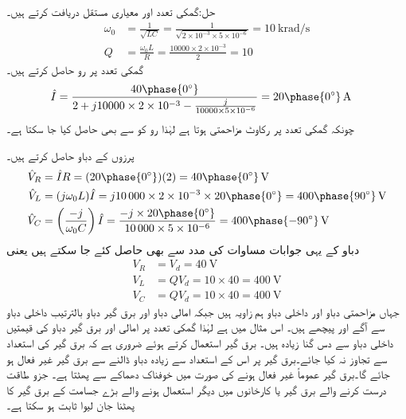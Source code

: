 حل:گمکی تعدد اور معیاری مستقل دریافت کرتے ہیں۔
\begin{align*}
\omega_0&=\frac{1}{\sqrt{LC}}=\frac{1}{\sqrt{2\times 10^{-3}\times 5\times 10^{-6}}}=\SI{10}{\kilo\radian\per\second}\\
Q&=\frac{\omega_0 L}{R}=\frac{\num{10000}\times 2\times 10^{-3}}{2}=10
\end{align*}
گمکی تعدد پر رو حاصل کرتے ہیں۔
\begin{align*}
\hat{I}&=\frac{40\phase{0^{\circ}}}{2+j10000\times 2\times 10^{-3}-\frac{j}{10000\times 5 \times 10^{-6}}}=20\phase{0^{\circ}}\,\si{\ampere}
\end{align*}
چونکہ گمکی تعدد پر رکاوٹ مزاحمتی ہوتا ہے لہٰذا رو کو  سے بھی حاصل کیا جا سکتا ہے۔

پرزوں کے دباو حاصل کرتے ہیں۔
\begin{align*}
\hat{V}_R&=\hat{I} R=(20\phase{0^{\circ}})(2)=40\phase{0^{\circ}}\,\si{\volt}\\
\hat{V}_L&=(j\omega_0 L) \hat{I}=j \num{10000}\times 2\times 10^{-3} \times 20\phase{0^{\circ}}=400\phase{90^{\circ}}\,\si{\volt}\\
\hat{V}_C&=\left(\frac{-j}{\omega_0 C}\right) \hat{I}=\frac{-j\times 20\phase{0^{\circ}}}{\num{10000}\times 5\times 10^{-6}}=400\phase{-90^{\circ}}\,\si{\volt}
\end{align*}
دباو کے یہی جوابات مساوات  کی مدد سے بھی حاصل کئے جا سکتے ہیں یعنی
\begin{align*}
V_R&=V_d=\SI{40}{\volt}\\
V_L&=Q V_d=10\times 40=\SI{400}{\volt}\\
V_C&=Q V_d=10\times 40=\SI{400}{\volt}
\end{align*}
جہاں مزاحمتی دباو اور داخلی دباو ہم زاویہ ہیں جبکہ امالی دباو اور برق گیر دباو بالترتیب داخلی دباو سے  آگے اور پیچھے ہیں۔ اس مثال میں  ہے لہٰذا گمکی تعدد پر امالی اور برق گیر دباو کی قیمتیں داخلی دباو سے دس گنا زیادہ ہیں۔ 
برق گیر استعمال کرتے ہوئے ضروری ہے کہ برق گیر کی استعداد سے تجاوز نہ کیا جائے۔برق گیر پر اس کے استعداد سے زیادہ دباو ڈالنے سے برق گیر غیر فعال ہو جائے گا۔برق گیر عموماً غیر فعال ہونے کی صورت میں خوفناک دھماکے سے پھٹتا ہے۔ جزو طاقت درست کرنے والے برق گیر یا کارخانوں میں دیگر استعمال ہونے والے بڑے جسامت کے برق گیر کا پھٹنا جان لیوا ثابت ہو سکتا ہے۔

